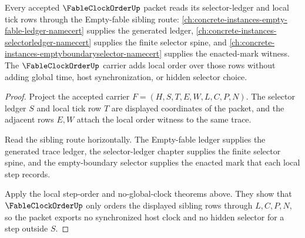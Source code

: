 \begin{theorem}
\label{thm:fable-clock-order-empty-fable-sibling-route}
Every accepted $\FableClockOrderUp$ packet reads its selector-ledger and local tick rows through the Empty-fable sibling route: \autoref{ch:concrete-instances-empty-fable-ledger-namecert} supplies the generated ledger, \autoref{ch:concrete-instances-selectorledger-namecert} supplies the finite selector spine, and \autoref{ch:concrete-instances-emptyboundaryselector-namecert} supplies the enacted-mark witness. The $\FableClockOrderUp$ carrier adds local order over those rows without adding global time, host synchronization, or hidden selector choice.
\end{theorem}
\begin{proof}
Project the accepted carrier $F=(H,S,T,E,W,L,C,P,N)$. The selector ledger $S$ and local tick row $T$ are displayed coordinates of the packet, and the adjacent rows $E,W$ attach the local order witness to the same trace.

Read the sibling route horizontally. The Empty-fable ledger supplies the generated trace ledger, the selector-ledger chapter supplies the finite selector spine, and the empty-boundary selector supplies the enacted mark that each local step records.

Apply the local step-order and no-global-clock theorems above. They show that $\FableClockOrderUp$ only orders the displayed sibling rows through $L,C,P,N$, so the packet exports no synchronized host clock and no hidden selector for a step outside $S$.
\end{proof}


\begin{closurestatus}{\FableClockOrderUp}
  \theoryclosure{\seedClosure}
  \formalstatus{\unformalizedV}
\end{closurestatus}
